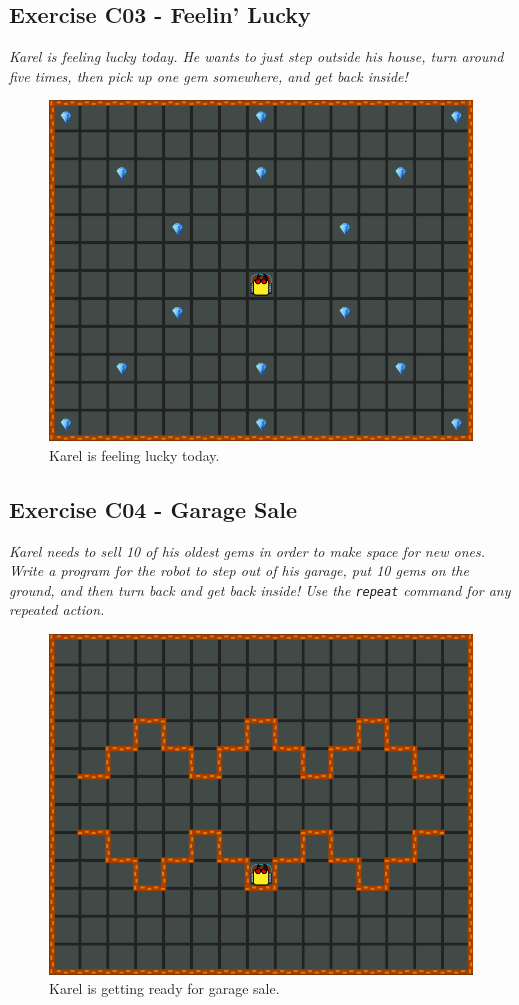 {{{{\subsection{Exercise C03 - Feelin' Lucky}

{\em Karel is feeling lucky today. He wants to just step outside his house, 
turn around five times, then pick up one gem somewhere, and get back inside!}\\[-7mm]


\begin{figure}[!ht]
\begin{center}
\includegraphics[height=0.4\textwidth]{imgk/c03.png}
\end{center}
\vspace{-4mm}
\caption{Karel is feeling lucky today.}
\label{fig:c03}
\vspace{-4mm}
\end{figure}
\noindent


\subsection{Exercise C04 - Garage Sale}

{\em Karel needs to sell 10 of his oldest gems in order to make space for new ones. 
Write a program for the robot to step out of his garage, put 10 gems on the ground, 
and then turn back and get back inside! Use the {\tt repeat} command for any repeated 
action.}\\[-7mm]


\begin{figure}[!ht]
\begin{center}
\includegraphics[height=0.4\textwidth]{imgk/c04.png}
\end{center}
\vspace{-4mm}
\caption{Karel is getting ready for garage sale.}
\label{fig:c04}
\vspace{-10mm}
\end{figure}
\noindent

}}}}
